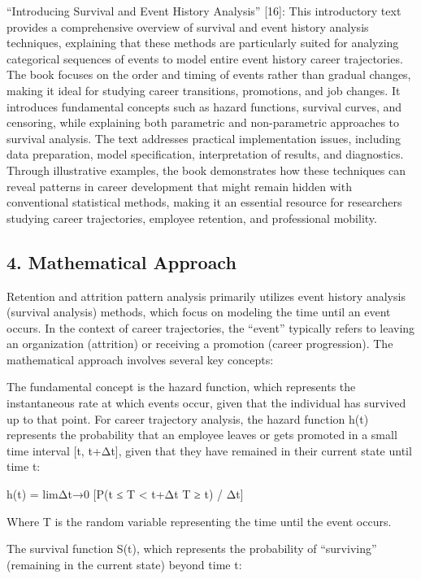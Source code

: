 \documentclass[
  letterpaper,
  DIV=11,
  numbers=noendperiod]{scrartcl}
\begin{document}
``Introducing Survival and Event History Analysis'' {[}16{]}: This
introductory text provides a comprehensive overview of survival and
event history analysis techniques, explaining that these methods are
particularly suited for analyzing categorical sequences of events to
model entire event history career trajectories. The book focuses on the
order and timing of events rather than gradual changes, making it ideal
for studying career transitions, promotions, and job changes. It
introduces fundamental concepts such as hazard functions, survival
curves, and censoring, while explaining both parametric and
non-parametric approaches to survival analysis. The text addresses
practical implementation issues, including data preparation, model
specification, interpretation of results, and diagnostics. Through
illustrative examples, the book demonstrates how these techniques can
reveal patterns in career development that might remain hidden with
conventional statistical methods, making it an essential resource for
researchers studying career trajectories, employee retention, and
professional mobility.

\subsection{4. Mathematical Approach}\label{mathematical-approach}

Retention and attrition pattern analysis primarily utilizes event
history analysis (survival analysis) methods, which focus on modeling
the time until an event occurs. In the context of career trajectories,
the ``event'' typically refers to leaving an organization (attrition) or
receiving a promotion (career progression). The mathematical approach
involves several key concepts:

The fundamental concept is the hazard function, which represents the
instantaneous rate at which events occur, given that the individual has
survived up to that point. For career trajectory analysis, the hazard
function h(t) represents the probability that an employee leaves or gets
promoted in a small time interval {[}t, t+Δt{]}, given that they have
remained in their current state until time t:

h(t) = limΔt→0 {[}P(t ≤ T \textless{} t+Δt \textbar{} T ≥ t) / Δt{]}

Where T is the random variable representing the time until the event
occurs.

The survival function S(t), which represents the probability of
``surviving'' (remaining in the current state) beyond time t:
\end{document}
